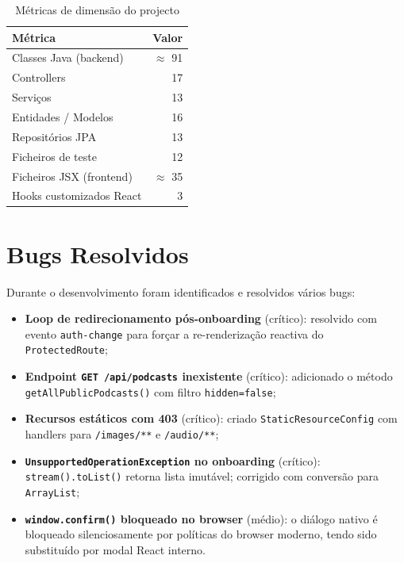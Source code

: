 \documentclass[12pt, a4paper]{report}
\begin{document}
\begin{table}[H]
  \centering
  \begin{tabular}{lr}
    \toprule
    \textbf{Métrica} & \textbf{Valor} \\
    \midrule
    Classes Java (backend)   & $\approx$ 91 \\
    Controllers              & 17 \\
    Serviços                 & 13 \\
    Entidades / Modelos      & 16 \\
    Repositórios JPA         & 13 \\
    Ficheiros de teste       & 12 \\
    Ficheiros JSX (frontend) & $\approx$ 35 \\
    Hooks customizados React & 3 \\
    \bottomrule
  \end{tabular}
  \caption{Métricas de dimensão do projecto}
\end{table}

\section{Bugs Resolvidos}

Durante o desenvolvimento foram identificados e resolvidos vários bugs:

\begin{itemize}
  \item \textbf{Loop de redirecionamento pós-onboarding} (crítico): resolvido com evento \texttt{auth-change} para forçar a re-renderização reactiva do \texttt{ProtectedRoute};
  \item \textbf{Endpoint \texttt{GET /api/podcasts} inexistente} (crítico): adicionado o método \texttt{getAllPublicPodcasts()} com filtro \texttt{hidden=false};
  \item \textbf{Recursos estáticos com 403} (crítico): criado \texttt{StaticResourceConfig} com handlers para \texttt{/images/**} e \texttt{/audio/**};
  \item \textbf{\texttt{UnsupportedOperationException} no onboarding} (crítico): \texttt{stream().toList()} retorna lista imutável; corrigido com conversão para \texttt{ArrayList};
  \item \textbf{\texttt{window.confirm()} bloqueado no browser} (médio): o diálogo nativo é bloqueado silenciosamente por políticas do browser moderno, tendo sido substituído por modal React interno.
\end{itemize}
\end{document}
